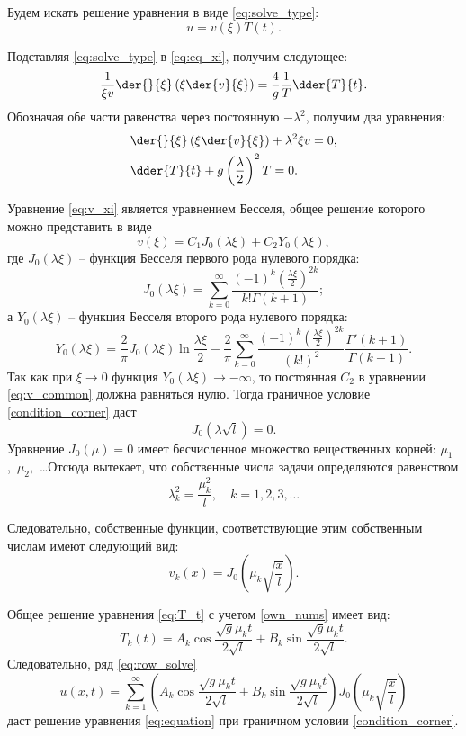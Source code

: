 Будем искать решение уравнения в виде \eqref{eq:solve_type}:
\begin{equation}
    u = v(\xi)T(t).
    \label{eq:solve_type}
\end{equation}

Подставляя \eqref{eq:solve_type} в \eqref{eq:eq_xi}, получим следующее:
\[
    \frac{1}{\xi v}\der{}{\xi}\left(\xi\der{v}{\xi}\right) = \frac{4}{g}\frac{1}{T}\dder{T}{t}.
\]
Обозначая обе части равенства через постоянную \( -\lambda^2 \), получим два
уравнения:
\begin{align}
    & \der{}{\xi}\left(\xi\der{v}{\xi}\right) + \lambda^2\xi v = 0, \label{eq:v_xi} \\
    & \dder{T}{t} + g\left(\frac{\lambda}{2}\right)^2T = 0. \label{eq:T_t}
\end{align}

Уравнение \eqref{eq:v_xi} является уравнением Бесселя, общее решение которого
можно представить в виде
\begin{equation}
    v(\xi) = C_1J_0(\lambda\xi) + C_2Y_0(\lambda\xi),
    \label{eq:v_common}
\end{equation}
где \( J_0(\lambda\xi) \) -- функция Бесселя первого рода нулевого порядка:
\[
    J_0(\lambda\xi) =
    \sum\limits_{k = 0}^\infty \frac{(-1)^k\left(\frac{\lambda\xi}{2}\right)^{2k}}
    {k!\Gamma(k + 1)};
\]
а \( Y_0(\lambda\xi) \) -- функция Бесселя второго рода нулевого порядка:
\[
    Y_0(\lambda\xi) = \frac{2}{\pi}J_0(\lambda\xi)\ln\frac{\lambda\xi}{2} - \frac{2}{\pi}
    \sum\limits_{k = 0}^\infty \frac{(-1)^k\left(\frac{\lambda\xi}{2}\right)^{2k}}{(k!)^2}
    \frac{\Gamma'(k+1)}{\Gamma(k+1)}.
\]
Так как при \( \xi \to 0 \) функция \( Y_0(\lambda\xi) \to -\infty \), то постоянная \( C_2 \) в
уравнении \eqref{eq:v_common} должна равняться нулю. Тогда граничное условие
\eqref{condition_corner} даст
\[
    J_0(\lambda\sqrt{l}) = 0.
\]
Уравнение \( J_0(\mu) = 0 \) имеет бесчисленное множество вещественных корней:
\( \mu_1 \),~\( \mu_2 \),~\ldots Отсюда вытекает, что собственные числа задачи
определяются равенством
\begin{equation}
    \lambda_k^2 = \frac{\mu_k^2}{l}, \hspace{1em} k = 1, 2, 3, \ldots
    \label{own_nums}
\end{equation}

Следовательно, собственные функции, соответствующие этим собственным числам
имеют следующий вид:
\[
    v_k(x) = J_0\left(\mu_k\sqrt{\frac{x}{l}}\right).
\]

Общее решение уравнения \eqref{eq:T_t} с учетом \eqref{own_nums} имеет вид:
\[
    T_k(t) = A_k\cos\frac{\sqrt{g}\mu_kt}{2\sqrt{l}} + B_k\sin\frac{\sqrt{g}\mu_kt}{2\sqrt{l}}.
\]
Следовательно, ряд \eqref{eq:row_solve}
\begin{equation}
    u(x, t) = \sum\limits_{k = 1}^\infty \left(A_k\cos\frac{\sqrt{g}\mu_kt}{2\sqrt{l}} +
    B_k\sin\frac{\sqrt{g}\mu_kt}{2\sqrt{l}}\right)J_0\left(\mu_k\sqrt{\frac{x}{l}}\right)
    \label{eq:row_solve}
\end{equation}
даст решение уравнения \eqref{eq:equation} при граничном условии
\eqref{condition_corner}.

